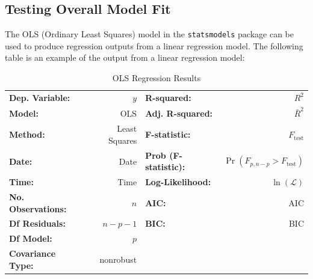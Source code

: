\documentclass{article}
\begin{document}
\subsection{Testing Overall Model Fit}
The OLS (Ordinary Least Squares) model in the \texttt{statsmodels}
package can be used to produce regression outputs from a linear
regression model. The following table is an example of the output from
a linear regression model:
\begin{table}[H]
    \centering
    \begin{tabular}{lrlr}
        \toprule
        \textbf{Dep. Variable:}    & \(y\)         & \textbf{R-squared:}          & \(R^2\)                                                  \\
        \textbf{Model:}            & OLS           & \textbf{Adj. R-squared:}     & \(\bar{R}^2\)                                            \\
        \textbf{Method:}           & Least Squares & \textbf{F-statistic:}        & \(F_{\mathrm{test}}\)                                    \\
        \textbf{Date:}             & Date          & \textbf{Prob (F-statistic):} & \(\Pr{\left( F_{p, n - p} > F_{\mathrm{test}} \right)}\) \\
        \textbf{Time:}             & Time          & \textbf{Log-Likelihood:}     & \(\ln{\left( \mathcal{L} \right)}\)                      \\
        \textbf{No. Observations:} & \(n\)         & \textbf{AIC:}                & AIC                                                      \\
        \textbf{Df Residuals:}     & \(n - p - 1\) & \textbf{BIC:}                & BIC                                                      \\
        \textbf{Df Model:}         & \(p\)         &                              &                                                          \\
        \textbf{Covariance Type:}  & nonrobust     &                              &                                                          \\
        \bottomrule
    \end{tabular}
    \caption{OLS Regression Results} %
\end{table}
\end{document}
